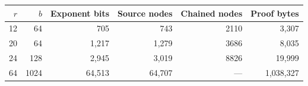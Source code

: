 \begin{tabular}{rrrrrr}
\toprule
$r$ & $b$ & Exponent bits & Source nodes & Chained nodes & Proof bytes \\
\midrule
12 & 64 & 705 & 743 & 2110 & 3,307 \\
20 & 64 & 1,217 & 1,279 & 3686 & 8,035 \\
24 & 128 & 2,945 & 3,019 & 8826 & 19,999 \\
64 & 1024 & 64,513 & 64,707 & --- & 1,038,327 \\
\bottomrule
\end{tabular}
